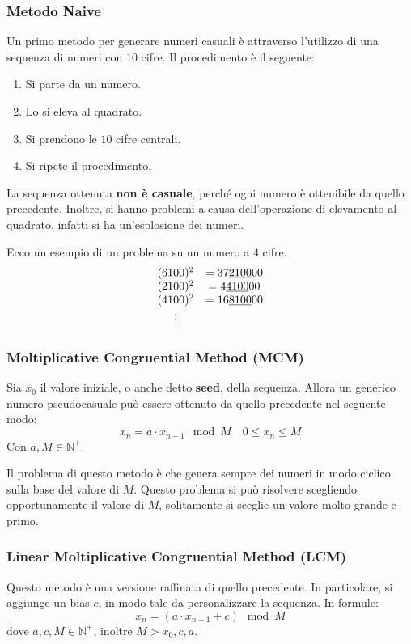 \subsubsection{Metodo Naive}
Un primo metodo per generare numeri casuali è attraverso l'utilizzo di una sequenza
di numeri con $10$ cifre. Il procedimento è il seguente:
\begin{enumerate}
    \item Si parte da un numero.
    \item Lo si eleva al quadrato.
    \item Si prendono le $10$ cifre centrali.
    \item Si ripete il procedimento.
\end{enumerate}
La sequenza ottenuta \textbf{non è casuale}, perché ogni numero è ottenibile da
quello precedente. Inoltre, si hanno problemi a causa dell'operazione di elevamento
al quadrato, infatti si ha un'esplosione dei numeri.
\begin{esempio}
    Ecco un esempio di un problema su un numero a $4$ cifre.
    \begin{equation*}
        \begin{array}[pos]{cc}
            (6100)^2 & = 37\underline{2100}00 \\
            (2100)^2 & = 4\underline{4100}00  \\
            (4100)^2 & = 16\underline{8100}00 \\
            \vdots
        \end{array}
    \end{equation*}
\end{esempio}
\subsubsection{Moltiplicative Congruential Method (MCM)}
Sia $x_0$ il valore iniziale, o anche detto \textbf{seed}, della sequenza. Allora
un generico numero pseudocasuale può essere ottenuto da quello precedente nel
seguente modo:
\begin{equation}
    x_n = a \cdot x_{n-1} \mod M \quad 0 \leq x_n \leq M
\end{equation}
Con $a, M \in \mathbb{N}^+$.

Il problema di questo metodo è che genera sempre dei numeri in modo ciclico sulla
base del valore di $M$. Questo problema si può risolvere scegliendo opportunamente
il valore di $M$, solitamente si sceglie un valore molto grande e primo.
\subsubsection{Linear Moltiplicative Congruential Method (LCM)}
Questo metodo è una versione raffinata di quello precedente. In particolare, si
aggiunge un bias $c$, in modo tale da personalizzare la sequenza. In formule:
\begin{equation}
    x_n = (a \cdot x_{n-1} + c) \mod M
\end{equation}
dove $a,c,M \in \mathbb{N}^+$, inoltre $M > x_0, c, a$.

